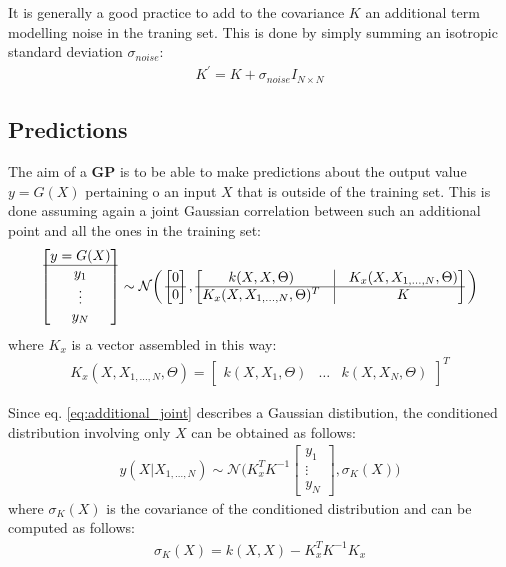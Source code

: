 \documentclass{article}
\begin{document}
It is generally a good practice to add to the covariance $K$ an additional term modelling noise in the traning set. This is done by simply summing an isotropic standard deviation $\sigma_{noise}$:
\begin{eqnarray}
K^{'} = K + \sigma_{noise} I_{N \times N} 
\end{eqnarray}

\subsection{Predictions}
\label{sec:predictions_scalar}

The aim of a \textbf{GP} is to be able to make predictions about the output value $y = G(X)$ pertaining o an input $X$ that is outside of the training set. This is done assuming again a joint Gaussian correlation between such an additional point and all the ones in the training set: 
\begin{eqnarray}
\begin{bmatrix} y = G(X) \\ \hline y_1 \\ \vdots \\ y_N \end{bmatrix} \sim \mathcal{N} 
\bigg (
\begin{bmatrix} 0 \\ \hline 0 \end{bmatrix},
\begin{bmatrix}
k(X,X, \Theta) & \vline & K_x(X, X_{1,\hdots,N}, \Theta) \\ 
\hline
K_x(X, X_{1,\hdots,N}, \Theta)^T & \vline & K
\end{bmatrix}
\bigg )
\end{eqnarray}
where $K_x$ is a vector assembled in this way:
\begin{eqnarray}
K_x(X, X_{1,\hdots,N}, \Theta) = \begin{bmatrix}
k(X, X_1 , \Theta) & \hdots & k(X, X_N , \Theta)
\end{bmatrix}^T
\label{eq:additional_joint}
\end{eqnarray}

Since eq. \ref{eq:additional_joint} describes a Gaussian distibution, the conditioned distribution involving only $X$ can be obtained as follows:
\begin{eqnarray}
y(X | X_{1,\hdots,N}) 
\sim \mathcal{N} \bigg ( 
K_x^T K^{-1} \begin{bmatrix} y_1 \\ \vdots \\ y_N \end{bmatrix} , 
\sigma_K(X)
\bigg )  
\label{eq:scalar_prediction}
\end{eqnarray}
where $\sigma_K(X)$ is the covariance of the conditioned distribution and can be computed as follows:
\begin{eqnarray}
\sigma_K(X) =
k(X,X) - K_x^T K^{-1} K_x
\end{eqnarray}
\end{document}
